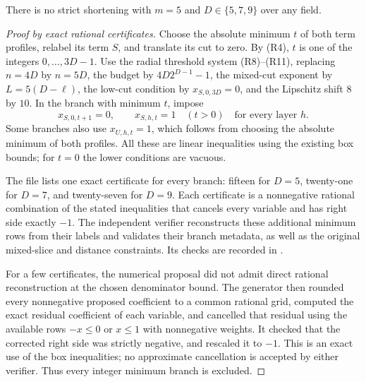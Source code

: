 \begin{proposition}
\label{prop:width-five-odd-certificates}
There is no strict shortening with $m=5$ and
$D\in\{5,7,9\}$ over any field.
\end{proposition}
\begin{proof}[Proof by exact rational certificates]
Choose the absolute minimum $t$ of both term profiles,
relabel its term $S$, and translate its cut to zero.
By (R4), $t$ is one of the integers $0,\ldots,3D-1$.
Use the radial threshold system (R8)--(R11), replacing
$n=4D$ by $n=5D$, the budget by $4D2^{D-1}-1$,
the mixed-cut exponent by $L=5(D-\ell)$, the low-cut
condition by $x_{S,0,3D}=0$, and the Lipschitz shift
$8$ by $10$.
In the branch with minimum $t$, impose
\[
 x_{S,0,t+1}=0,\qquad x_{S,h,t}=1\quad(t>0)
 \quad\text{for every layer }h.
 \tag{R13}
\]
Some branches also use $x_{U,h,t}=1$, which follows
from choosing the absolute minimum of both profiles.
All these are linear inequalities using the existing
box bounds; for $t=0$ the lower conditions are vacuous.

The file
lists one exact certificate for every branch: fifteen
for $D=5$, twenty-one for $D=7$, and twenty-seven for
$D=9$.  Each certificate is a nonnegative rational
combination of the stated inequalities that cancels
every variable and has right side exactly $-1$.
The independent verifier
reconstructs these additional minimum rows from their
labels and validates their branch metadata, as well
as the original mixed-slice and distance constraints.
Its checks are recorded in
.

For a few certificates, the numerical proposal did not
admit direct rational reconstruction at the chosen
denominator bound.  The generator then rounded every
nonnegative proposed coefficient to a common rational
grid, computed the exact residual coefficient of each
variable, and cancelled that residual using the
available rows $-x\le0$ or $x\le1$ with nonnegative
weights.  It checked that the corrected right side
was strictly negative, and rescaled it to $-1$.
This is an exact use of the box inequalities; no
approximate cancellation is accepted by either verifier.
Thus every integer minimum branch is excluded.
\end{proof}

